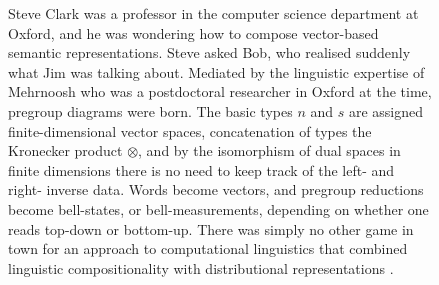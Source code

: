 \begin{figure}[h!]
\centering
{}
\caption{Steve Clark was a professor in the computer science department at Oxford, and he was wondering how to compose vector-based semantic representations. Steve asked Bob, who realised suddenly what Jim was talking about. Mediated by the linguistic expertise of Mehrnoosh who was a postdoctoral researcher in Oxford at the time, pregroup diagrams were born. The basic types $n$ and $s$ are assigned finite-dimensional vector spaces, concatenation of types the Kronecker product $\otimes$, and by the isomorphism of dual spaces in finite dimensions there is no need to keep track of the left- and right- inverse data. Words become vectors, and pregroup reductions become bell-states, or bell-measurements, depending on whether one reads top-down or bottom-up. There was simply no other game in town for an approach to computational linguistics that combined linguistic compositionality with distributional representations \citep{coecke_mathematical_2010}.}
\end{figure}

